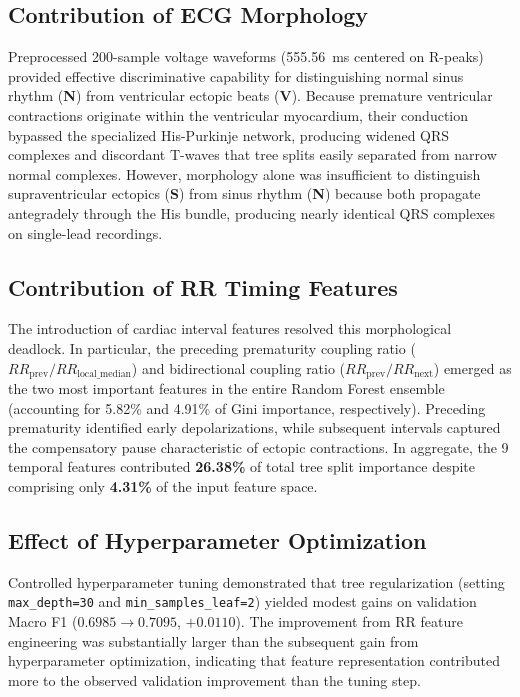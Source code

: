 \documentclass[conference]{IEEEtran}
\begin{document}
\subsection{Contribution of ECG Morphology}
Preprocessed 200-sample voltage waveforms (555.56~ms centered on R-peaks) provided effective discriminative capability for distinguishing normal sinus rhythm (\textbf{N}) from ventricular ectopic beats (\textbf{V}). Because premature ventricular contractions originate within the ventricular myocardium, their conduction bypassed the specialized His-Purkinje network, producing widened QRS complexes and discordant T-waves that tree splits easily separated from narrow normal complexes. However, morphology alone was insufficient to distinguish supraventricular ectopics (\textbf{S}) from sinus rhythm (\textbf{N}) because both propagate antegradely through the His bundle, producing nearly identical QRS complexes on single-lead recordings.

\subsection{Contribution of RR Timing Features}
The introduction of cardiac interval features resolved this morphological deadlock. In particular, the preceding prematurity coupling ratio ($RR_{\text{prev}} / RR_{\text{local\_median}}$) and bidirectional coupling ratio ($RR_{\text{prev}} / RR_{\text{next}}$) emerged as the two most important features in the entire Random Forest ensemble (accounting for 5.82\% and 4.91\% of Gini importance, respectively). Preceding prematurity identified early depolarizations, while subsequent intervals captured the compensatory pause characteristic of ectopic contractions. In aggregate, the 9 temporal features contributed \textbf{26.38\%} of total tree split importance despite comprising only \textbf{4.31\%} of the input feature space.

\subsection{Effect of Hyperparameter Optimization}
Controlled hyperparameter tuning demonstrated that tree regularization (setting \texttt{max\_depth=30} and \texttt{min\_samples\_leaf=2}) yielded modest gains on validation Macro F1 ($0.6985 \to 0.7095$, $+0.0110$). The improvement from RR feature engineering was substantially larger than the subsequent gain from hyperparameter optimization, indicating that feature representation contributed more to the observed validation improvement than the tuning step.
\end{document}
